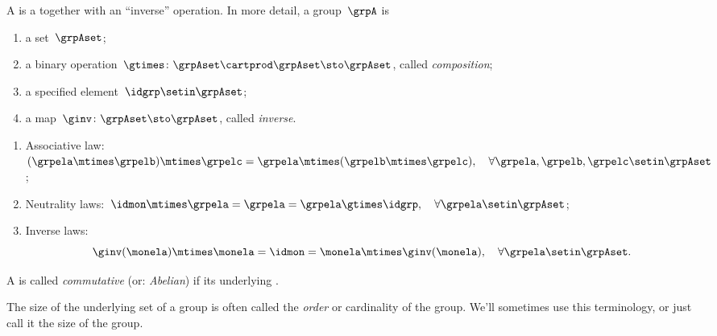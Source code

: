 \begin{ctdefinition}[Group]
    \label{def:group}
    A  is a  together with an ``inverse'' operation.
    In more detail, a group~$\grpA$ is
    \begin{body}
        \constit
        \begin{enumerate}
            \item a set~$\grpAset$;
            \item a binary operation~$\gtimes \colon \grpAset \cartprod \grpAset \sto \grpAset$, called \emph{composition};
            \item a specified element~$\idgrp \setin \grpAset$;
            \item a map~$\ginv\colon \grpAset \sto \grpAset$, called \emph{inverse}.
        \end{enumerate}
        \condit
        \begin{enumerate}
            \item Associative law:~$(\grpela\mtimes \grpelb)\mtimes \grpelc=\grpela\mtimes (\grpelb\mtimes \grpelc), \quad \forall  \grpela, \grpelb, \grpelc \setin \grpAset$;
            \item Neutrality laws:~$\idmon\mtimes \grpela=\grpela=\grpela \gtimes \idgrp, \quad \forall  \grpela \setin \grpAset$;
            \item Inverse laws:
                  \begin{equation}
                      \label{eq:group-inverse-law}
                      \ginv(\monela) \mtimes \monela = \idmon = \monela \mtimes \ginv(\monela), \quad \forall  \grpela  \setin \grpAset.
                  \end{equation}
        \end{enumerate}
    \end{body}
\end{ctdefinition}

\begin{ctdefinition}\label{def:commutative-group}
    A  is called \emph{commutative} (or: \emph{Abelian}) if its underlying .
\end{ctdefinition}

\begin{remark}
    The size of the underlying set of a group is often called the \emph{order} or cardinality of the group.
    We'll sometimes use this terminology, or just call it the size of the group.
\end{remark}

